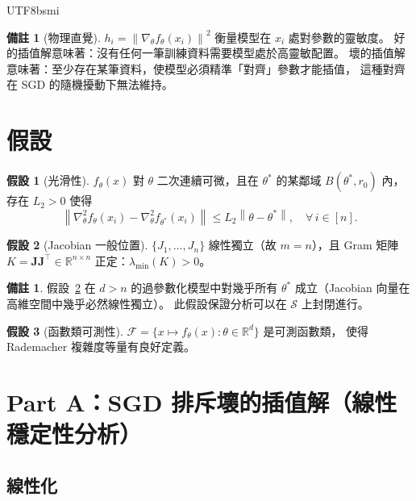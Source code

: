 \documentclass[11pt,a4paper]{article}
\theoremstyle{definition}
\newtheorem{assumption}{假設}
\newtheorem{remark}[theorem]{備註}
\newcommand{\R}{\mathbb{R}}
\newcommand{\cS}{\mathcal{S}}
\newcommand{\cF}{\mathcal{F}}
\newcommand{\bJ}{\mathbf{J}}
\newcommand{\norm}[1]{\left\|#1\right\|}
\begin{document}
\begin{CJK}{UTF8}{bsmi}
\begin{remark}[物理直覺]
  $h_i = \norm{\nabla_\theta f_\theta(x_i)}^2$ 衡量模型在 $x_i$ 處對參數的靈敏度。
  好的插值解意味著：沒有任何一筆訓練資料需要模型處於高靈敏配置。
  壞的插值解意味著：至少存在某筆資料，使模型必須精準「對齊」參數才能插值，
  這種對齊在 SGD 的隨機擾動下無法維持。
\end{remark}


\section{假設}

\begin{assumption}[光滑性]\label{asm:smooth}
  $f_\theta(x)$ 對 $\theta$ 二次連續可微，且在 $\theta^*$ 的某鄰域
  $B(\theta^*, r_0)$ 內，存在 $L_2 > 0$ 使得
  \[
    \norm{\nabla^2_\theta f_\theta(x_i) - \nabla^2_\theta f_{\theta^*}(x_i)} \leq L_2\norm{\theta - \theta^*},
    \quad \forall\, i \in [n].
  \]
\end{assumption}

\begin{assumption}[Jacobian 一般位置]\label{asm:general-position}
  $\{J_1, \ldots, J_n\}$ 線性獨立（故 $m = n$），且
  Gram 矩陣 $K = \bJ\bJ^\top \in \R^{n \times n}$ 正定：$\lambda_{\min}(K) > 0$。
\end{assumption}

\begin{remark}
  假設~\ref{asm:general-position} 在 $d > n$ 的過參數化模型中對幾乎所有
  $\theta^*$ 成立（Jacobian 向量在高維空間中幾乎必然線性獨立）。
  此假設保證分析可以在 $\cS$ 上封閉進行。
\end{remark}

\begin{assumption}[函數類可測性]\label{asm:measurable}
  $\cF = \{x \mapsto f_\theta(x) : \theta \in \R^d\}$ 是可測函數類，
  使得 Rademacher 複雜度等量有良好定義。
\end{assumption}


\section{Part A：SGD 排斥壞的插值解（線性穩定性分析）}

\subsection{線性化}


\end{CJK}
\end{document}
